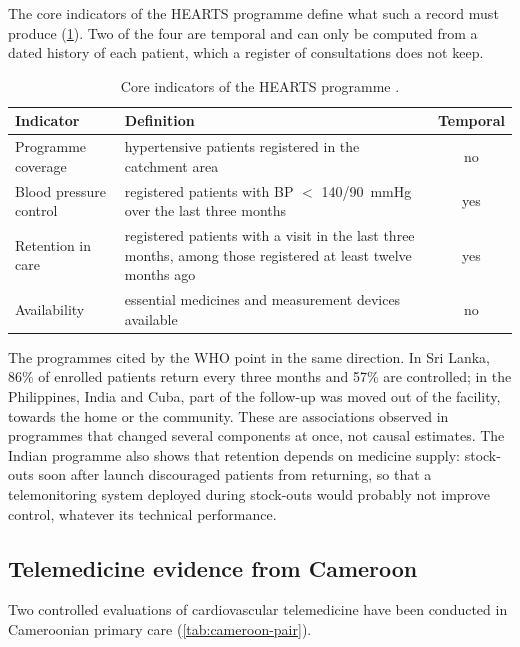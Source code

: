 The core indicators of the HEARTS programme define what such a record must produce (\cref{tab:hearts}). Two of the four are temporal and can only be computed from a dated history of each patient, which a register of consultations does not keep.

\begin{table}[htbp]
\centering\small
\caption{Core indicators of the HEARTS programme \parencite{who2023hypertension}.}\label{tab:hearts}
\begin{tabularx}{\textwidth}{@{}>{\raggedright\arraybackslash}p{3.6cm} X c@{}}
\toprule
\textbf{Indicator} & \textbf{Definition} & \textbf{Temporal} \\
\midrule
Programme coverage & hypertensive patients registered in the catchment area & no \\
Blood pressure control & registered patients with BP $<$ 140/90~mmHg over the last three months & yes \\
Retention in care & registered patients with a visit in the last three months, among those registered at least twelve months ago & yes \\
Availability & essential medicines and measurement devices available & no \\
\bottomrule
\end{tabularx}
\end{table}

The programmes cited by the WHO point in the same direction. In Sri Lanka, 86\% of enrolled patients return every three months and 57\% are controlled; in the Philippines, India and Cuba, part of the follow-up was moved out of the facility, towards the home or the community. These are associations observed in programmes that changed several components at once, not causal estimates. The Indian programme also shows that retention depends on medicine supply: stock-outs soon after launch discouraged patients from returning, so that a telemonitoring system deployed during stock-outs would probably not improve control, whatever its technical performance.

\subsection{Telemedicine evidence from Cameroon}\label{sec:telemedcam}\label{sec:bediang}\label{sec:cameroon-joint}

Two controlled evaluations of cardiovascular telemedicine have been conducted in Cameroonian primary care (\cref{tab:cameroon-pair}).

